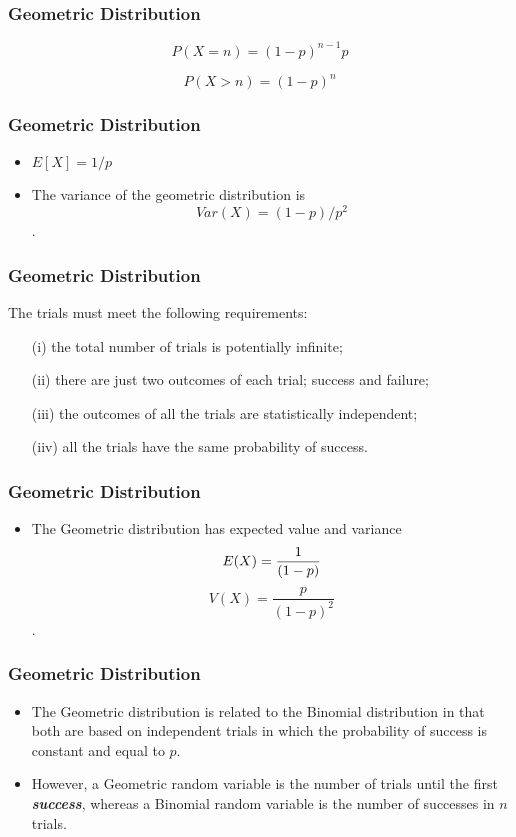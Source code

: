 \documentclass[IntroMain.tex]{subfiles}
\begin{document}
\begin{frame}
	\frametitle{Geometric Distribution}
	
	\[ P(X = n) = (1-p)^{n-1}p \]
	
	\[ P(X > n) = (1-p)^n \]
	
	
\end{frame}
\begin{frame}
	\frametitle{Geometric Distribution}
	
	\begin{itemize}
		\item $ E[X] = 1/p $
		
		\item The variance of the geometric distribution is 
		\[Var(X) = (1-p)/p^2\].
		
	\end{itemize}
	
\end{frame}
\begin{frame}
	\frametitle{Geometric Distribution}
	\Large
	The trials must meet the following requirements:
	
	\begin{itemize}
		\item[(i)] the total number of trials is potentially infinite;
		\item[(ii)] there are just two outcomes of each trial; success and failure;
		\item[(iii)] the outcomes of all the trials are statistically independent;
		\item[(iiv)] all the trials have the same probability of success.
	\end{itemize}
	
\end{frame}
\begin{frame}
	\frametitle{Geometric Distribution}
	\Large
	\begin{itemize}
		\item The Geometric distribution has expected value and variance  \[E(X)= {1\over(1-p)}\] \[V(X)=\frac{p}{{(1-p)^2}}\].
		
	\end{itemize}
	
\end{frame}
\begin{frame}
	\frametitle{Geometric Distribution}
	\Large
	\begin{itemize}
		\item The Geometric distribution is related to the Binomial distribution in that both are based on independent trials in which the probability of success is constant and equal to $p$. 
		
		\item However, a Geometric random variable is the number of trials until the first \textit{\textbf{success}}, whereas a Binomial random variable is the number of successes in $n$ trials.
	\end{itemize}
\end{frame}
\end{document}
